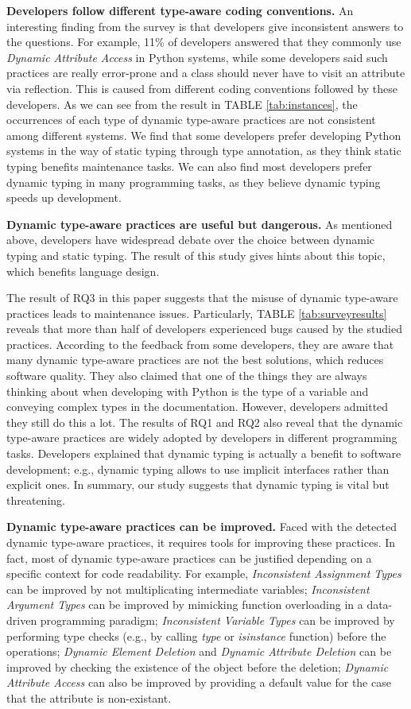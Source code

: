 \textbf{Developers follow different type-aware coding conventions.} An interesting finding from the survey is that developers give inconsistent answers to the questions. For example, 11\% of developers answered that they commonly use \emph{Dynamic Attribute Access} in Python systems, while some developers said such practices are really error-prone and a class should never have to visit an attribute via reflection. This is caused from different coding conventions followed by these developers. As we can see from the result in TABLE \ref{tab:instances}, the occurrences of each type of dynamic type-aware practices are not consistent among different systems. We find that some developers prefer developing Python systems in the way of static typing through type annotation, as they think static typing benefits maintenance tasks. We can also find most developers prefer dynamic typing in many programming tasks, as they believe dynamic typing speeds up development. 


\textbf{Dynamic type-aware practices are useful but dangerous.} As mentioned above, developers have widespread debate over the choice between dynamic typing and static typing. The result of this study gives hints about this topic, which benefits language design.

The result of RQ3 in this paper suggests that the misuse of dynamic type-aware practices leads to maintenance issues. Particularly, TABLE \ref{tab:surveyresults} reveals that more than half of developers experienced bugs caused by the studied practices. According to the feedback from some developers, they are aware that many dynamic type-aware practices are not the best solutions, which reduces software quality. They also claimed that one of the things they are always thinking about when developing with Python is the type of a variable and conveying complex types in the documentation. However, developers admitted they still do this a lot. The results of RQ1 and RQ2 also reveal that the dynamic type-aware practices are widely adopted by developers in different programming tasks. Developers explained that dynamic typing is actually a benefit to software development; e.g., dynamic typing allows to use implicit interfaces rather than explicit ones. In summary, our study suggests that dynamic typing is vital but threatening.

\textbf{Dynamic type-aware practices can be improved.} Faced with the detected dynamic type-aware practices, it requires tools for improving these practices. In fact, most of dynamic type-aware practices can be justified depending on a specific context for code readability. For example, 
\emph{Inconsistent Assignment Types} can be improved by not multiplicating intermediate variables; 
\emph{Inconsistent Argument Types} can be improved by mimicking function overloading in a data-driven programming paradigm; 
\emph{Inconsistent Variable Types} can be improved by performing type checks (e.g., by calling \textit{type} or \textit{isinstance} function) before the operations;
\emph{Dynamic Element Deletion} and \emph{Dynamic Attribute Deletion} can be improved by checking the existence of the object before the deletion;
\emph{Dynamic Attribute Access} can also be improved by providing a default value for the case that the attribute is non-existant.

